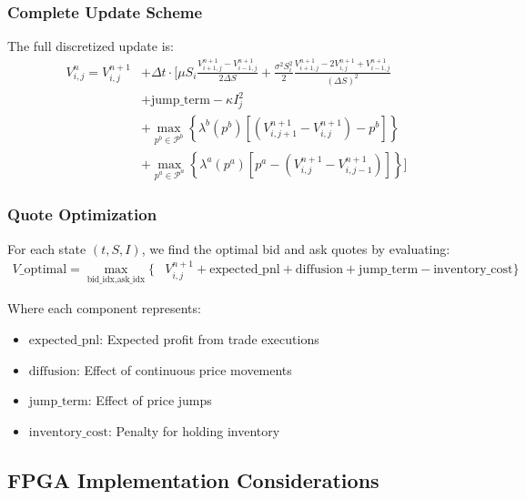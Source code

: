 \documentclass[twocolumn,11pt]{IEEEtran}  %
\begin{document}
\begin{onecolumn}
\subsubsection{Complete Update Scheme}
The full discretized update is:
\begin{equation}
\begin{aligned}
V^n_{i,j} = V^{n+1}_{i,j} &+ \Delta t \cdot \Bigg[\mu S_i \frac{V^{n+1}_{i+1,j} - V^{n+1}_{i-1,j}}{2\Delta S} + \frac{\sigma^2 S_i^2}{2}\frac{V^{n+1}_{i+1,j} - 2V^{n+1}_{i,j} + V^{n+1}_{i-1,j}}{(\Delta S)^2} \\
&+ \text{jump\_term} - \kappa I_j^2 \\
&+ \max_{p^b \in \mathcal{P}^b} \left\{\lambda^b(p^b) \left[(V^{n+1}_{i,j+1} - V^{n+1}_{i,j}) - p^b\right]\right\} \\
&+ \max_{p^a \in \mathcal{P}^a} \left\{\lambda^a(p^a) \left[p^a - (V^{n+1}_{i,j} - V^{n+1}_{i,j-1})\right]\right\}\Bigg]
\end{aligned}
\end{equation}

\subsubsection{Quote Optimization}
For each state $(t, S, I)$, we find the optimal bid and ask quotes by evaluating:
\begin{equation}
\begin{aligned}
V\_\text{optimal} = \max_{\text{bid\_idx}, \text{ask\_idx}} \Bigg\{ &V^{n+1}_{i,j} + \text{expected\_pnl} + \text{diffusion} + \text{jump\_term} - \text{inventory\_cost}\Bigg\}
\end{aligned}
\end{equation}

Where each component represents:
\begin{itemize}
    \item $\text{expected\_pnl}$: Expected profit from trade executions
    \item $\text{diffusion}$: Effect of continuous price movements
    \item $\text{jump\_term}$: Effect of price jumps
    \item $\text{inventory\_cost}$: Penalty for holding inventory
\end{itemize}

\subsection{FPGA Implementation Considerations}


\end{onecolumn}
\end{document}
